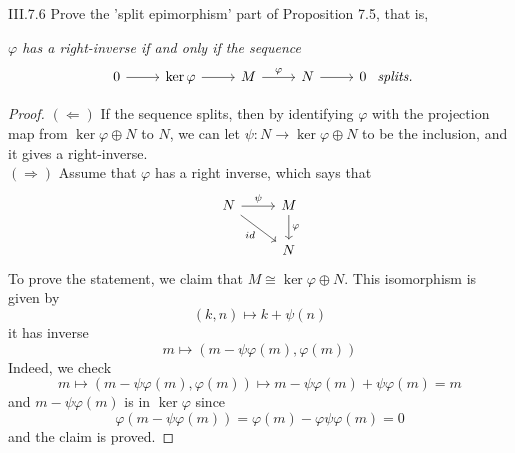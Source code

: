 \begin{problem}{III.7.6}
Prove the 'split epimorphism' part of Proposition 7.5, that is,

\textit{$\varphi$ has a right-inverse if and only if the sequence} 
\[
\begin{tikzcd}
0 \arrow[r] & \ker \varphi \arrow[r] & M \arrow[r, "\varphi"] & N \arrow[r] & 0
\end{tikzcd}	
\textit{ splits.}
\]
\end{problem}
\begin{proof}

\noindent $(\Leftarrow)$ If the sequence splits, then by identifying $\varphi$ with the projection map from $\ker \varphi \oplus N$ to $N$, we can let $\psi : N \to \ker \varphi \oplus N $ to be the inclusion, and it gives a right-inverse. \\
$(\Rightarrow)$ Assume that $\varphi$ has a right inverse, which says that 
\[
\begin{tikzcd}
N \arrow[r, "\psi"] \arrow[rd, "id"'] & M \arrow[d, "\varphi"] \\
& N
\end{tikzcd}	
\]
To prove the statement, we claim that $M \cong \ker \varphi \oplus N$. This isomorphism is given by 
\[
(k,n) \mapsto k + \psi (n)
\]
it has inverse
\[
m \mapsto (m-\psi\varphi(m), \varphi(m))	
\]
Indeed, we check
\[
m \mapsto (m-\psi\varphi(m), \varphi(m)) \mapsto m-\psi\varphi(m) + \psi\varphi(m) = m
\]
and $m-\psi\varphi(m)$ is in $\ker \varphi$ since
\[
\varphi(m-\psi\varphi(m)) = \varphi(m) - \varphi\psi\varphi(m) = 0
\]
and the claim is proved.
\end{proof}

